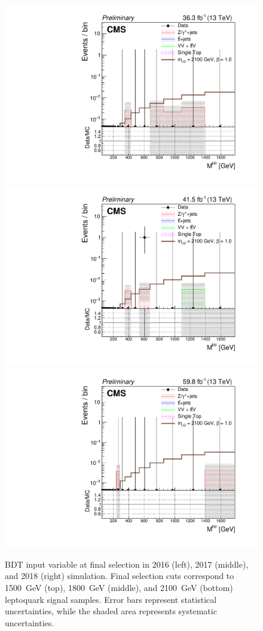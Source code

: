 \begin{figure}[H]
    {\includegraphics[width=.32\textwidth]{Images/Analysis/Results_2016_Unblinded/Plots/Final_selection/BasicLQ_uujj_M_uu_final2100.pdf}}
    {\includegraphics[width=.32\textwidth]{Images/Analysis/Results_2017_Unblinded/Plots/Final_selection/BasicLQ_uujj_M_uu_final2100.pdf}}
    {\includegraphics[width=.32\textwidth]{Images/Analysis/Results_2018_Unblinded/Plots/Final_selection/BasicLQ_uujj_M_uu_final2100.pdf}}
    \caption{BDT input variable \Muu at final selection in 2016 (left), 2017 (middle), and 2018 (right) simulation. Final selection cuts correspond to \SI{1500}{GeV} (top), \SI{1800}{GeV} (middle), and \SI{2100}{GeV} (bottom) leptoquark signal samples. Error bars represent statistical uncertainties, while the shaded area represents systematic uncertainties.
    \label{figapp:finalSelMuu}}
\end{figure}

